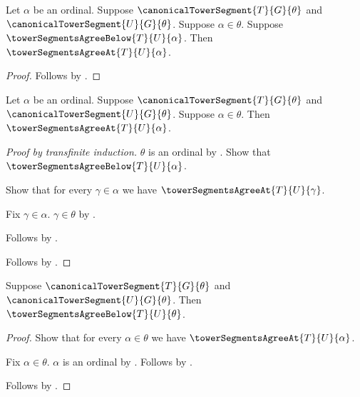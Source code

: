 \begin{proposition}\label{canonical_tower_agreement_step}
    Let $\alpha$ be an ordinal.
    Suppose $\canonicalTowerSegment{T}{G}{\theta}$ and
        $\canonicalTowerSegment{U}{G}{\theta}$.
    Suppose $\alpha\in\theta$.
    Suppose $\towerSegmentsAgreeBelow{T}{U}{\alpha}$.
    Then $\towerSegmentsAgreeAt{T}{U}{\alpha}$.
\end{proposition}
\begin{proof}
    Follows by
        .
\end{proof}

\begin{theorem}\label{canonical_tower_segments_agree_at}
    Let $\alpha$ be an ordinal.
    Suppose $\canonicalTowerSegment{T}{G}{\theta}$ and
        $\canonicalTowerSegment{U}{G}{\theta}$.
    Suppose $\alpha\in\theta$.
    Then $\towerSegmentsAgreeAt{T}{U}{\alpha}$.
\end{theorem}
\begin{proof}[Proof by transfinite induction]
    $\theta$ is an ordinal by
        .
    Show that $\towerSegmentsAgreeBelow{T}{U}{\alpha}$.
    \begin{subproof}
        Show that for every $\gamma\in\alpha$ we have
            $\towerSegmentsAgreeAt{T}{U}{\gamma}$.
        \begin{subproof}
            Fix $\gamma\in\alpha$.
            $\gamma\in\theta$ by
                .
        \end{subproof}
        Follows by .
    \end{subproof}
    Follows by .
\end{proof}

\begin{theorem}\label{canonical_tower_segments_agree_below}
    Suppose $\canonicalTowerSegment{T}{G}{\theta}$ and
        $\canonicalTowerSegment{U}{G}{\theta}$.
    Then $\towerSegmentsAgreeBelow{T}{U}{\theta}$.
\end{theorem}
\begin{proof}
    Show that for every $\alpha\in\theta$ we have
        $\towerSegmentsAgreeAt{T}{U}{\alpha}$.
    \begin{subproof}
        Fix $\alpha\in\theta$.
        $\alpha$ is an ordinal by
            .
        Follows by .
    \end{subproof}
    Follows by .
\end{proof}

